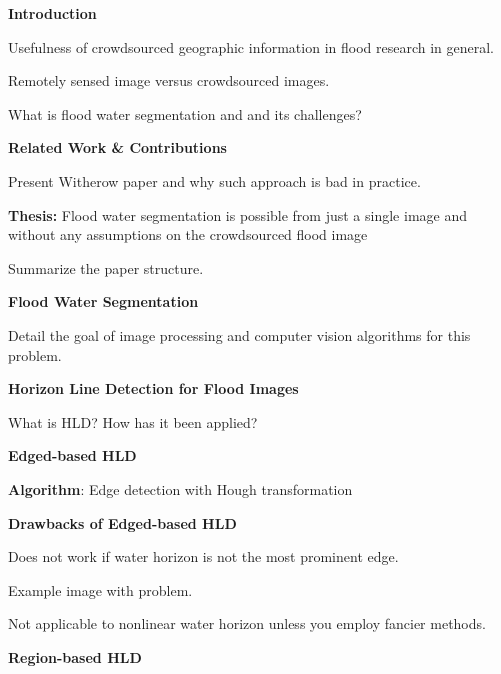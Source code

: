 \documentclass{report}
\begin{document}
\begin{outline}
  \item {\bf Introduction }
  \begin{outline}
    \item Usefulness of crowdsourced geographic information in flood research in general.
    \item Remotely sensed image versus crowdsourced images.
    \item What is flood water segmentation and and its challenges?
  \end{outline}
    \item {\bf Related Work \& Contributions}
    \begin{outline}
	    \item Present Witherow paper and why such approach is bad in practice.
	    \item {\bf Thesis:} Flood water segmentation is possible from just a single image and without any 						 assumptions on the crowdsourced flood image
	    \item Summarize the paper structure.
    \end{outline}
    \item {\bf Flood Water Segmentation}
    \begin{outline}
	    \item Detail the goal of image processing and computer vision algorithms for this problem.
	    \item {\bf Horizon Line Detection for Flood Images}
	    	\begin{outline}
			    \item What is HLD? How has it been applied?
			    \item {\bf Edged-based HLD}
			    \begin{outline}
			    	\item {\bf Algorithm}: Edge detection with Hough transformation
			    \end{outline}
			    \item {\bf Drawbacks of Edged-based HLD}
			    \begin{outline}
			    	\item Does not work if water horizon is not the most prominent edge.
				\item Example image with problem.
				\item Not applicable to nonlinear water horizon unless you employ fancier methods.
			    \end{outline}
			    \item {\bf Region-based HLD}

\end{outline}
\end{outline}
\end{outline}
\end{document}
